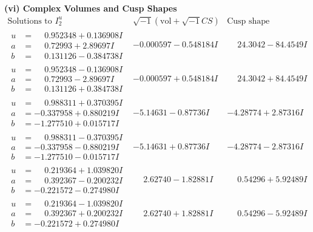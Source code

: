 \documentclass[1p]{elsarticle_modified}
\theoremstyle{definition}
\newcommand{\I}{\sqrt{-1}}
\begin{document}
\newpage\flushleft \textbf{(vi) Complex Volumes and Cusp Shapes}
$$\begin{array}{c|c|c}  
\text{Solutions to }I^u_{2}& \I (\text{vol} + \sqrt{-1}CS) & \text{Cusp shape}\\
 \hline 
\begin{aligned}
u &= \phantom{-}0.952348 + 0.136908 I \\
a &= \phantom{-}0.72993 + 2.89697 I \\
b &= \phantom{-}0.131126 - 0.384738 I\end{aligned}
 & -0.000597 - 0.548184 I & \phantom{-}24.3042 - 84.4549 I \\ \hline\begin{aligned}
u &= \phantom{-}0.952348 - 0.136908 I \\
a &= \phantom{-}0.72993 - 2.89697 I \\
b &= \phantom{-}0.131126 + 0.384738 I\end{aligned}
 & -0.000597 + 0.548184 I & \phantom{-}24.3042 + 84.4549 I \\ \hline\begin{aligned}
u &= \phantom{-}0.988311 + 0.370395 I \\
a &= -0.337958 + 0.880219 I \\
b &= -1.277510 + 0.015717 I\end{aligned}
 & -5.14631 - 0.87736 I & -4.28774 + 2.87316 I \\ \hline\begin{aligned}
u &= \phantom{-}0.988311 - 0.370395 I \\
a &= -0.337958 - 0.880219 I \\
b &= -1.277510 - 0.015717 I\end{aligned}
 & -5.14631 + 0.87736 I & -4.28774 - 2.87316 I \\ \hline\begin{aligned}
u &= \phantom{-}0.219364 + 1.039820 I \\
a &= \phantom{-}0.392367 - 0.200232 I \\
b &= -0.221572 - 0.274980 I\end{aligned}
 & \phantom{-}2.62740 - 1.82881 I & \phantom{-}0.54296 + 5.92489 I \\ \hline\begin{aligned}
u &= \phantom{-}0.219364 - 1.039820 I \\
a &= \phantom{-}0.392367 + 0.200232 I \\
b &= -0.221572 + 0.274980 I\end{aligned}
 & \phantom{-}2.62740 + 1.82881 I & \phantom{-}0.54296 - 5.92489 I \\ \hline\begin{aligned}

\end{aligned}
\end{array}$$
\end{document}
